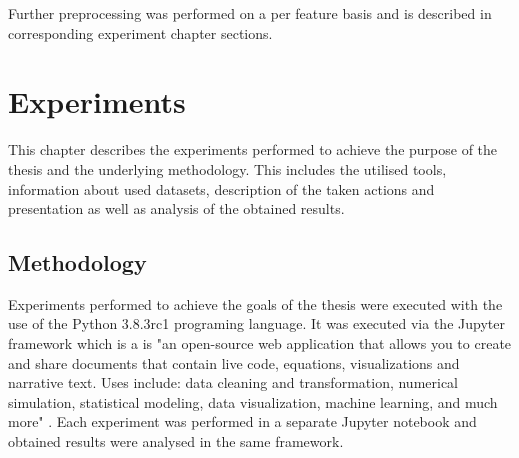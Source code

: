\documentclass[a4paper,twoside,12pt]{book}
\begin{document}
Further preprocessing was performed on a per feature basis and is described in corresponding
experiment chapter sections.



\chapter{Experiments}


This chapter describes the experiments performed to achieve the purpose of the thesis
and the underlying methodology. This includes the utilised tools, information about used datasets,
description of the taken actions and presentation as well as analysis of the obtained results. 


\section{Methodology}

Experiments performed to achieve the goals of the thesis were executed with the use of 
the Python 3.8.3rc1 programing language. It was executed via the Jupyter framework which is
a is "an open-source web application that allows you to create and share documents that 
contain live code, equations, visualizations and narrative text. Uses include: data cleaning 
and transformation, numerical simulation, statistical modeling, data visualization, machine 
learning, and much more" \cite{bib:jupyter}. Each experiment was performed in a separate
Jupyter notebook and obtained results were analysed in the same framework. 
\end{document}
